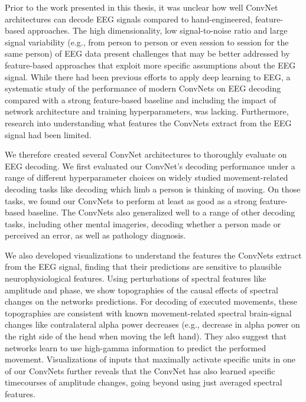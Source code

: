     Prior to the work presented in this thesis, it was unclear how well
ConvNet architectures can decode EEG signals compared to
hand-engineered, feature-based approaches. The high dimensionality, low
signal-to-noise ratio and large signal variability (e.g., from person to
person or even session to session for the same person) of EEG data
present challenges that may be better addressed by feature-based
approaches that exploit more specific assumptions about the EEG signal.
While there had been previous efforts to apply deep learning to EEG, a
systematic study of the performance of modern ConvNets on EEG decoding
compared with a strong feature-based baseline and including the impact
of network architecture and training hyperparameters, was lacking.
Furthermore, research into understanding what features the ConvNets
extract from the EEG signal had been limited.

    We therefore created several ConvNet architectures to thoroughly
evaluate on EEG decoding. We first evaluated our ConvNet's decoding
performance under a range of different hyperparameter choices on widely
studied movement-related decoding tasks like decoding which limb a
person is thinking of moving. On those tasks, we found our ConvNets to
perform at least as good as a strong feature-based baseline. The
ConvNets also generalized well to a range of other decoding tasks,
including other mental imageries, decoding whether a person made or
perceived an error, as well as pathology diagnosis.

We also developed visualizations to understand the features the ConvNets
extract from the EEG signal, finding that their predictions are
sensitive to plausible neurophysiological features. Using perturbations
of spectral features like amplitude and phase, we show topographies of
the causal effects of spectral changes on the networks predictions. For
decoding of executed movements, these topographies are consistent with
known movement-related spectral brain-signal changes like contralateral
alpha power decreases (e.g., decrease in alpha power on the right side
of the head when moving the left hand). They also suggest that networks
learn to use high-gamma information to predict the performed movement.
Visualizations of inputs that maximally activate specific units in one
of our ConvNets further reveals that the ConvNet has also learned
specific timecourses of amplitude changes, going beyond using just
averaged spectral features.


